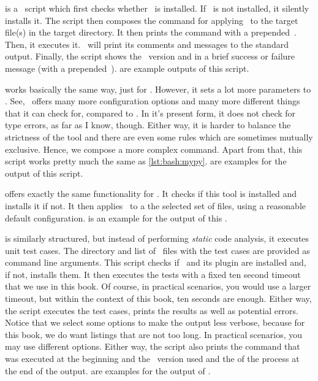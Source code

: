  is a \bash\ script which first checks whether \mypy\ is installed.
If \mypy\ is not installed, it silently installs it.
The script then composes the command for applying \mypy\ to the target file(s) in the target directory.
It then prints the command with a prepended~\expandafter\textil{\$}.
Then, it executes it.
\mypy\ will print its comments and messages to the standard output.
Finally, the script shows the \mypy\ version and  in a brief success or failure message (with a prepended~\expandafter\textil{\#}).
 are example outputs of this script.

 works basically the same way, just for \ruff.
However, it sets a lot more parameters to \ruff.
See, \ruff\ offers many more configuration options and many more different things that it can check for, compared to \mypy.
In it's present form, it does not check for type errors, as far as I know, though.
Either way, it is harder to balance the strictness of the tool and there are even some rules which are sometimes mutually exclusive.
Hence, we compose a more complex command.
Apart from that, this script works pretty much the same as \cref{lst:bash:mypy}.
 are examples for the output of this script.

 offers exactly the same functionality for \pylint.
It checks if this tool is installed and installs it if not.
It then applies \pylint\ to a the selected set of files, using a reasonable default configuration.
 is an example for the output of this .

 is similarly structured, but instead of performing \emph{static} code analysis, it executes unit test cases.
The directory and list of \python\ files with the test cases are provided as command line arguments.
This script checks if \pytest\ and its plugin  are installed and, if not, installs them.
It then executes the tests with a fixed ten second timeout that we use in this book.
Of course, in practical scenarios, you would use a larger timeout, but within the context of this book, ten seconds are enough.
Either way, the script executes the test cases, prints the results as well as potential errors.
Notice that we select some options to make the output less verbose, because for this book, we do want listings that are not too long.
In practical scenarios, you may use different options.
Either way, the script also prints the command that was executed at the beginning and the \pytest\ version used and the  of the process at the end of the output.
 are examples for the output of \pytest.%
%
\endhsection%
%
